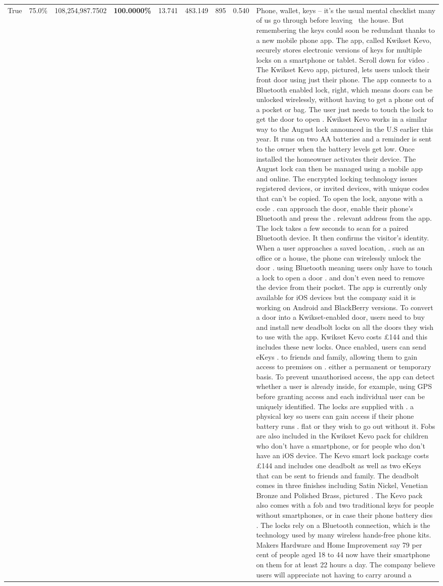 \begin{table}[H]
\begin{tabular}{lllrlllll}
True & 75.0\% & 108,254,987.7502 & \bfseries \color{red} 100.0000\% & 13.741 & 483.149 & 895 & 0.540 & Phone, wallet, keys – it’s the usual mental checklist many of us go through before leaving  the house. But remembering the keys could soon be redundant thanks to a new mobile phone app. The app, called Kwikset Kevo, securely stores electronic versions of keys for multiple locks on a smartphone or tablet. Scroll down for video . The Kwikset Kevo app, pictured, lets users unlock their front door using just their phone. The app connects to a Bluetooth enabled lock, right, which means doors can be unlocked wirelessly, without having to get a phone out of a pocket or bag. The user just needs to touch the lock to get the door to open . Kwikset Kevo works in a similar way to the August lock announced in the U.S earlier this year. It runs on two AA batteries and a reminder is sent to the owner when the battery levels get low. Once installed the homeowner activates their device. The August lock can then be managed using a mobile app and online. The encrypted locking technology issues registered devices, or invited devices, with unique codes that can't be copied. To open the lock, anyone with a code . can approach the door, enable their phone's Bluetooth and press the . relevant address from the app. The lock takes a few seconds to scan for a paired Bluetooth device. It then confirms the visitor's identity. When a user approaches a saved location, . such as an office or a house, the phone can wirelessly unlock the door . using Bluetooth meaning users only have to touch a lock to open a door . and don't even need to remove the device from their pocket. The app is currently only available for iOS devices but the company said it is working on Android and BlackBerry versions. To convert a door into a Kwikset-enabled door, users need to buy and install new deadbolt locks on all the doors they wish to use with the app. Kwikset Kevo costs £144 and this includes these new locks. Once enabled, users can send eKeys . to friends and family, allowing them to gain access to premises on . either a permanent or temporary basis. To prevent unauthorised access, the app can detect whether a user is already inside, for example, using GPS before granting access and each individual user can be uniquely identified. The locks are supplied with . a physical key so users can gain access if their phone battery runs . flat or they wish to go out without it. Fobs are also included in the Kwikset Kevo pack for children who don't have a smartphone, or for people who don't have an iOS device. The Kevo smart lock package costs £144 and includes one deadbolt as well as two eKeys that can be sent to friends and family. The deadbolt comes in three finishes including Satin Nickel, Venetian Bronze and Polished Brass, pictured . The Kevo pack also comes with a fob and two traditional keys for people without smartphones, or in case their phone battery dies . The locks rely on a Bluetooth connection, which is the technology used by many wireless hands-free phone kits. Makers Hardware and Home Improvement say 79 per cent of people aged 18 to 44 now have their smartphone on them for at least 22 hours a day. The company believe users will appreciate not having to carry around a 
\end{tabular}
\end{table}
